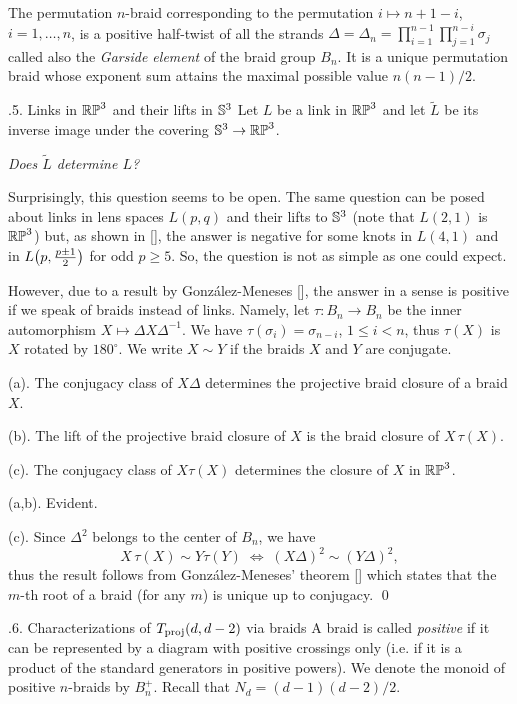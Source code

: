 The permutation $n$-braid corresponding to the permutation $i\mapsto n+1-i$, $i=1,\dots,n$, is a positive half-twist
of all the strands
$\Delta=\Delta_n=\prod_{i=1}^{n-1}\prod_{j=1}^{n-i}\sigma_j$ called also the {\it Garside element}
of the braid group $B_n$. It is a unique permutation braid whose exponent sum attains the
maximal possible value $n(n-1)/2$.

\subhead\sectPermut.5. Links in $\Bbb{RP}^3$ and their lifts in $\Bbb S^3$
\endsubhead
%
Let $L$ be a link in $\Bbb{RP}^3$ and let $\tilde L$ be its inverse image under the covering
$\Bbb S^3\to\Bbb{RP}^3$.

\medskip\centerline
 {\sl Does $\tilde L$ determine $L$?}

\medskip\noindent
Surprisingly, this question seems to be open.
The same question can be posed about links in lens spaces $L(p,q)$
and their lifts to $\Bbb S^3$ (note that $L(2,1)$ is $\Bbb{RP}^3$) but,
as shown in [], the answer is negative for some knots in $L(4,1)$
and in $L\big(p,{p\pm1\over2}\big)$ for odd $p\ge 5$.
So, the question is not as simple as one could expect.

However, due to a result by Gonz\'alez-Meneses [],
the answer in a sense is positive if we speak of braids instead of links.
Namely, let $\tau:B_n\to B_n$ be the inner automorphism
$X\mapsto\Delta X\Delta^{-1}$.
We have $\tau(\sigma_i)=\sigma_{n-i}$, $1\le i<n$, thus
$\tau(X)$ is $X$ rotated by $180^\circ$.
We write $X\sim Y$ if the braids $X$ and $Y$ are conjugate.

(a). The conjugacy class of $X\Delta$ determines the projective braid closure of
a braid $X$.

\smallskip
(b). The lift of the projective braid closure of $X$
is the braid closure of $X\,\tau(X)$.

\smallskip
(c). The conjugacy class of $X\tau(X)$ determines the closure of $X$ in $\Bbb{RP}^3$.
\endproclaim

(a,b). Evident.

\smallskip
(c). Since $\Delta^2$ belongs to the center of $B_n$, we have
$$
    X\,\tau(X)\sim Y\tau(Y) \;\Leftrightarrow\; (X\Delta)^2\sim(Y\Delta)^2,
$$
thus the result follows from Gonz\'alez-Meneses' theorem [] which states that
the $m$-th root of a braid (for any $m$) is unique up to conjugacy.
\qed\enddemo

\subhead\sectPermut.6. Characterizations of $T_{\operatorname{proj}}(d,d-2)$ via braids
\endsubhead
%
A braid is called {\it positive} if it can be represented by a diagram with positive crossings only
(i.e. if it is a product of the standard generators in positive powers).
We denote the monoid of positive $n$-braids by $B_n^+$.
Recall that $N_d = (d-1)(d-2)/2$.

